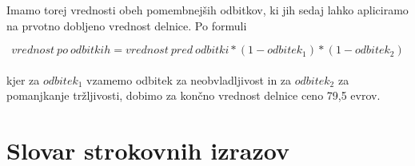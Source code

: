 \documentclass[12pt,a4paper]{amsart}
\theoremstyle{definition} %
\theoremstyle{plain} %
\newcommand{\geslo}[2]{\noindent\textbf{#1}\hspace*{3mm}\hangindent=\parindent\hangafter=1 #2}
\begin{document}
\begin{itemize}
Imamo torej vrednosti obeh pomembnejših odbitkov, ki jih sedaj lahko apliciramo na prvotno dobljeno vrednost delnice. Po formuli 

\begin{equation}
vrednost\ po\ odbitkih=vrednost\ pred\ odbitki *{(1-odbitek_1)}*{(1-odbitek_2)}
\end{equation}
\\
kjer za $odbitek_1$ vzamemo odbitek za neobvladljivost in za $odbitek_2$ za pomanjkanje tržljivosti, dobimo za končno vrednost delnice ceno 79,5 evrov.



\end{itemize}



\section*{Slovar strokovnih izrazov}

%
%


\begin{thebibliography}{99}




\end{thebibliography}
\end{document}

